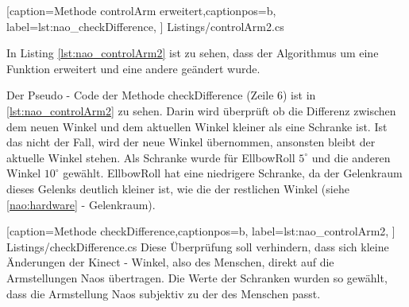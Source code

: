 
    [caption={Methode \textsf{controlArm erweitert}},captionpos=b,
       label=lst:nao_checkDifference,
       ]	
 {Listings/controlArm2.cs}

In Listing \ref{lst:nao_controlArm2} ist zu sehen, dass der Algorithmus um eine Funktion erweitert und eine andere geändert wurde.

Der Pseudo - Code der Methode \textsf{checkDifference} (Zeile 6) ist in \ref{lst:nao_controlArm2} zu sehen. Darin wird überprüft ob die Differenz zwischen dem neuen Winkel und dem aktuellen Winkel kleiner als eine Schranke ist. Ist das nicht der Fall, wird der neue Winkel übernommen, ansonsten bleibt der aktuelle Winkel stehen. 
Als Schranke wurde für EllbowRoll $5^\circ$ und die anderen Winkel $10^\circ$ gewählt. EllbowRoll hat eine niedrigere Schranke, da der Gelenkraum dieses Gelenks deutlich kleiner ist, wie die der restlichen Winkel (siehe \ref{nao:hardware} - Gelenkraum). 

    [caption={Methode \textsf{checkDifference}},captionpos=b,
       label=lst:nao_controlArm2,
       ]	
 {Listings/checkDifference.cs}
Diese Überprüfung soll verhindern, dass sich kleine Änderungen der Kinect - Winkel, also des Menschen, direkt auf die Armstellungen Naos übertragen. Die Werte der Schranken wurden so gewählt, dass die Armstellung Naos subjektiv zu der des Menschen passt.

